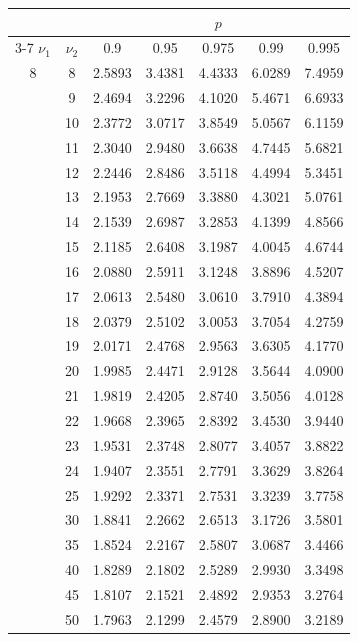 \newpage
\noindent
\begin{minipage}{0.49\textwidth}
	\begin{center}
		\begin{tabular}{ccccccc}
			& & \multicolumn{5}{c}{$p$}\\
			\cline{3-7}
			$\nu_1$ & $\nu_2$ & 0.9 & 0.95 & 0.975 & 0.99 & 0.995 \\
			\midrule
			8 & 8 & 2.5893 & 3.4381 & 4.4333 & 6.0289 & 7.4959 \\
			& 9 & 2.4694 & 3.2296 & 4.1020 & 5.4671 & 6.6933 \\[5pt]
			& 10 & 2.3772 & 3.0717 & 3.8549 & 5.0567 & 6.1159 \\
			& 11 & 2.3040 & 2.9480 & 3.6638 & 4.7445 & 5.6821 \\
			& 12 & 2.2446 & 2.8486 & 3.5118 & 4.4994 & 5.3451 \\
			& 13 & 2.1953 & 2.7669 & 3.3880 & 4.3021 & 5.0761 \\
			& 14 & 2.1539 & 2.6987 & 3.2853 & 4.1399 & 4.8566 \\
			& 15 & 2.1185 & 2.6408 & 3.1987 & 4.0045 & 4.6744 \\
			& 16 & 2.0880 & 2.5911 & 3.1248 & 3.8896 & 4.5207 \\
			& 17 & 2.0613 & 2.5480 & 3.0610 & 3.7910 & 4.3894 \\
			& 18 & 2.0379 & 2.5102 & 3.0053 & 3.7054 & 4.2759 \\
			& 19 & 2.0171 & 2.4768 & 2.9563 & 3.6305 & 4.1770 \\[5pt]
			& 20 & 1.9985 & 2.4471 & 2.9128 & 3.5644 & 4.0900 \\
			& 21 & 1.9819 & 2.4205 & 2.8740 & 3.5056 & 4.0128 \\
			& 22 & 1.9668 & 2.3965 & 2.8392 & 3.4530 & 3.9440 \\
			& 23 & 1.9531 & 2.3748 & 2.8077 & 3.4057 & 3.8822 \\
			& 24 & 1.9407 & 2.3551 & 2.7791 & 3.3629 & 3.8264 \\
			& 25 & 1.9292 & 2.3371 & 2.7531 & 3.3239 & 3.7758 \\
			& 30 & 1.8841 & 2.2662 & 2.6513 & 3.1726 & 3.5801 \\
			& 35 & 1.8524 & 2.2167 & 2.5807 & 3.0687 & 3.4466 \\
			& 40 & 1.8289 & 2.1802 & 2.5289 & 2.9930 & 3.3498 \\
			& 45 & 1.8107 & 2.1521 & 2.4892 & 2.9353 & 3.2764 \\[5pt]
			& 50 & 1.7963 & 2.1299 & 2.4579 & 2.8900 & 3.2189 \\

\end{tabular}
\end{center}
\end{minipage}

